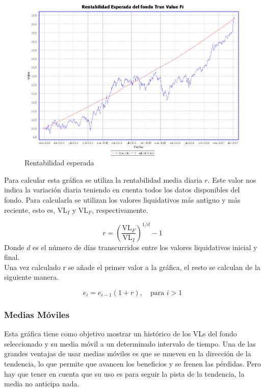 \documentclass[12pt, a4paper]{article}
\begin{document}
	\begin{figure}[htbp]
	\centering
	\includegraphics[width=\textwidth]{figuras/esperada.PNG}
	\caption{Rentabilidad esperada}
	\label{fig:esperada}
	\end {figure}

Para calcular esta gráfica se utiliza la rentabilidad media diaria $r$. Este valor nos indica la variación diaria teniendo en cuenta todos los datos disponibles del fondo. Para calcularla se utilizan los valores liquidativos más antiguo y más reciente, esto es, $\text{VL}_I$ y $\text{VL}_F$, respectivamente.

\begin{equation}
r=\left(\frac{\text{VL}_F}{\text{VL}_I}\right)^{1/d}-1
\end{equation} 
Donde $d$ es el número de días transcurridos entre los valores liquidativos inicial y final.\\

Una vez calculado r se añade el primer valor a la gráfica, el resto se calculan de la siguiente manera.

\begin{equation}
e_i= e_{i-1} \left(1 + r\right), \quad\text{para }i>1
\end{equation} 



\newpage

\subsubsection{Medias Móviles}

Esta gráfica tiene como objetivo mostrar un histórico de los \gls{VL}s del fondo seleccionado y su media móvil a un determinado intervalo de tiempo. Una de las grandes ventajas de usar medias móviles es que se mueven en la dirección de la tendencia, lo que permite que avancen los beneficios y se frenen las pérdidas. Pero hay que tener en cuenta que su uso es para seguir la pista de la tendencia, la media no anticipa nada.
\end{document}

